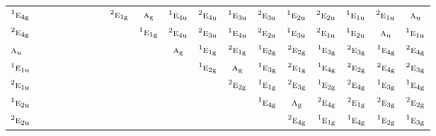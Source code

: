 \documentclass[10pt,a4paper]{article}
\numberwithin{equation}{section}
\newcommand{\irr}[1]{\text{\normalfont\scshape #1}}
\newcommand{\conjpair}[1]{{}^{#1}}
\newcommand{\ptag}[1]{\mathrm{#1}}
\begin{document}
{\begin{longtable}{@{}lcccccccccccccccccc@{}}
$\conjpair{1}\irr{e}_{4\ptag{g}}$ &  &  &  &  &  &  &  & $\conjpair{2}\irr{e}_{1\ptag{g}}$ & $\irr{a}_{\ptag{g}}$ & $\conjpair{1}\irr{e}_{4\ptag{u}}$ & $\conjpair{2}\irr{e}_{4\ptag{u}}$ & $\conjpair{1}\irr{e}_{3\ptag{u}}$ & $\conjpair{2}\irr{e}_{3\ptag{u}}$ & $\conjpair{1}\irr{e}_{2\ptag{u}}$ & $\conjpair{2}\irr{e}_{2\ptag{u}}$ & $\conjpair{1}\irr{e}_{1\ptag{u}}$ & $\conjpair{2}\irr{e}_{1\ptag{u}}$ & $\irr{a}_{\ptag{u}}$\\
$\conjpair{2}\irr{e}_{4\ptag{g}}$ &  &  &  &  &  &  &  &  & $\conjpair{1}\irr{e}_{1\ptag{g}}$ & $\conjpair{2}\irr{e}_{4\ptag{u}}$ & $\conjpair{2}\irr{e}_{3\ptag{u}}$ & $\conjpair{1}\irr{e}_{4\ptag{u}}$ & $\conjpair{2}\irr{e}_{2\ptag{u}}$ & $\conjpair{1}\irr{e}_{3\ptag{u}}$ & $\conjpair{2}\irr{e}_{1\ptag{u}}$ & $\conjpair{1}\irr{e}_{2\ptag{u}}$ & $\irr{a}_{\ptag{u}}$ & $\conjpair{1}\irr{e}_{1\ptag{u}}$\\
$\irr{a}_{\ptag{u}}$ &  &  &  &  &  &  &  &  &  & $\irr{a}_{\ptag{g}}$ & $\conjpair{1}\irr{e}_{1\ptag{g}}$ & $\conjpair{2}\irr{e}_{1\ptag{g}}$ & $\conjpair{1}\irr{e}_{2\ptag{g}}$ & $\conjpair{2}\irr{e}_{2\ptag{g}}$ & $\conjpair{1}\irr{e}_{3\ptag{g}}$ & $\conjpair{2}\irr{e}_{3\ptag{g}}$ & $\conjpair{1}\irr{e}_{4\ptag{g}}$ & $\conjpair{2}\irr{e}_{4\ptag{g}}$\\
$\conjpair{1}\irr{e}_{1\ptag{u}}$ &  &  &  &  &  &  &  &  &  &  & $\conjpair{1}\irr{e}_{2\ptag{g}}$ & $\irr{a}_{\ptag{g}}$ & $\conjpair{1}\irr{e}_{3\ptag{g}}$ & $\conjpair{2}\irr{e}_{1\ptag{g}}$ & $\conjpair{1}\irr{e}_{4\ptag{g}}$ & $\conjpair{2}\irr{e}_{2\ptag{g}}$ & $\conjpair{2}\irr{e}_{4\ptag{g}}$ & $\conjpair{2}\irr{e}_{3\ptag{g}}$\\
$\conjpair{2}\irr{e}_{1\ptag{u}}$ &  &  &  &  &  &  &  &  &  &  &  & $\conjpair{2}\irr{e}_{2\ptag{g}}$ & $\conjpair{1}\irr{e}_{1\ptag{g}}$ & $\conjpair{2}\irr{e}_{3\ptag{g}}$ & $\conjpair{1}\irr{e}_{2\ptag{g}}$ & $\conjpair{2}\irr{e}_{4\ptag{g}}$ & $\conjpair{1}\irr{e}_{3\ptag{g}}$ & $\conjpair{1}\irr{e}_{4\ptag{g}}$\\
$\conjpair{1}\irr{e}_{2\ptag{u}}$ &  &  &  &  &  &  &  &  &  &  &  &  & $\conjpair{1}\irr{e}_{4\ptag{g}}$ & $\irr{a}_{\ptag{g}}$ & $\conjpair{2}\irr{e}_{4\ptag{g}}$ & $\conjpair{2}\irr{e}_{1\ptag{g}}$ & $\conjpair{2}\irr{e}_{3\ptag{g}}$ & $\conjpair{2}\irr{e}_{2\ptag{g}}$\\
$\conjpair{2}\irr{e}_{2\ptag{u}}$ &  &  &  &  &  &  &  &  &  &  &  &  &  & $\conjpair{2}\irr{e}_{4\ptag{g}}$ & $\conjpair{1}\irr{e}_{1\ptag{g}}$ & $\conjpair{1}\irr{e}_{4\ptag{g}}$ & $\conjpair{1}\irr{e}_{2\ptag{g}}$ & $\conjpair{1}\irr{e}_{3\ptag{g}}$\\

\end{longtable}}
\end{document}

